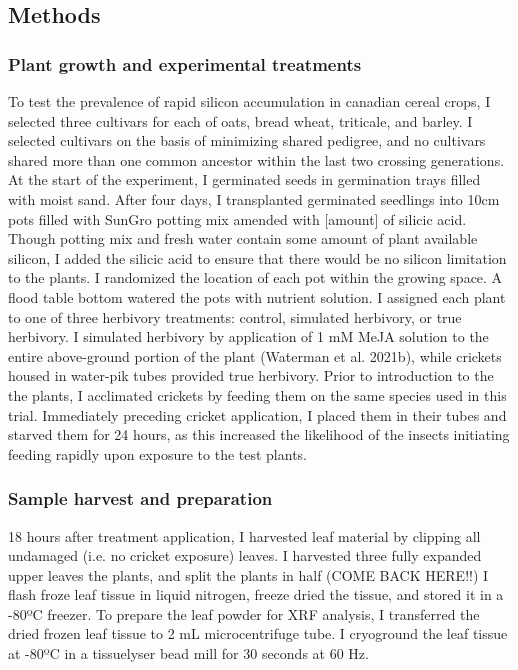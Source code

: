 \documentclass[12pt, letterpaper, ]{article}
\begin{document}
\subsection{Methods}

\subsubsection{Plant growth and experimental treatments}

To test the prevalence of rapid silicon accumulation in canadian cereal crops, I selected three cultivars for each of oats, bread wheat, triticale, and barley. I selected cultivars on the basis of minimizing shared pedigree, and no cultivars shared more than one common ancestor within the last two crossing generations. At the start of the experiment, I germinated seeds in germination trays filled with moist sand. After four days, I transplanted germinated seedlings into 10cm pots filled with SunGro potting mix amended with [amount] of silicic acid. Though potting mix and fresh water contain some amount of plant available silicon, I added the silicic acid to ensure that there would be no silicon limitation to the plants. I randomized the location of each pot within the growing space. A flood table bottom watered the pots with nutrient solution. I assigned each plant to one of three herbivory treatments: control, simulated herbivory, or true herbivory. I simulated herbivory by application of 1 mM MeJA solution to the entire above-ground portion of the plant (Waterman et al. 2021b), while crickets housed in water-pik tubes provided true herbivory. Prior to introduction to the the plants, I acclimated crickets by feeding them on the same species used in this trial. Immediately preceding cricket application, I placed them in their tubes and starved them for 24 hours, as this increased the likelihood of the insects initiating feeding rapidly upon exposure to the test plants. 

\subsubsection{Sample harvest and preparation}

18 hours after treatment application, I harvested leaf material by clipping all undamaged (i.e. no cricket exposure) leaves. I harvested three fully expanded upper leaves the plants, and split the plants in half (COME BACK HERE!!) I flash froze leaf tissue in liquid nitrogen, freeze dried the tissue, and stored it in a -80ºC freezer. To prepare the leaf powder for XRF analysis, I transferred the dried frozen leaf tissue to 2 mL microcentrifuge tube. I cryoground the leaf tissue at -80ºC in a tissuelyser bead mill for 30 seconds at 60 Hz.
\end{document}
